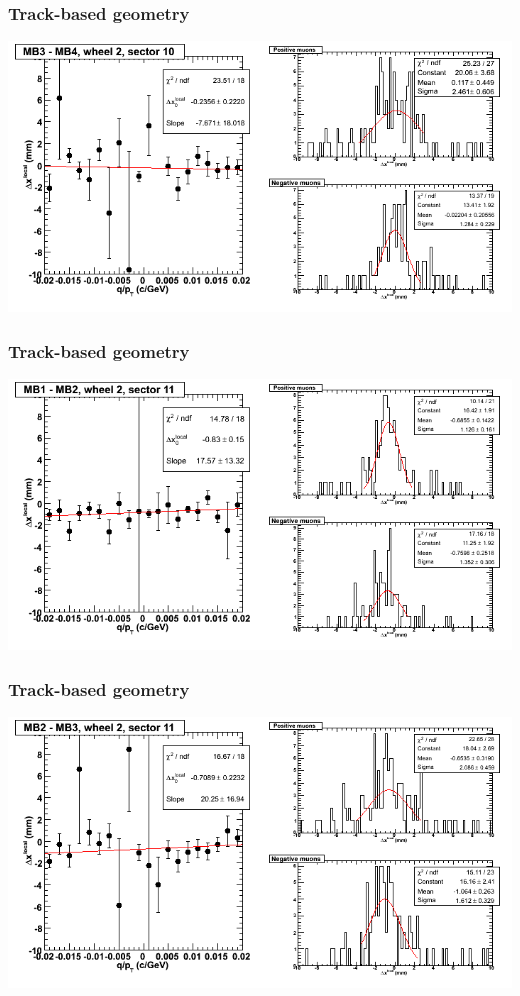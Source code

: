 \documentclass[compress]{beamer}
\begin{document}
\begin{frame}
\frametitle{Track-based geometry}
\includegraphics[width=\linewidth]{NOV4_segdiffs/dt13_resid_E_10_34.png}
\end{frame}

\begin{frame}
\frametitle{Track-based geometry}
\includegraphics[width=\linewidth]{NOV4_segdiffs/dt13_resid_E_11_12.png}
\end{frame}

\begin{frame}
\frametitle{Track-based geometry}
\includegraphics[width=\linewidth]{NOV4_segdiffs/dt13_resid_E_11_23.png}
\end{frame}
\end{document}
